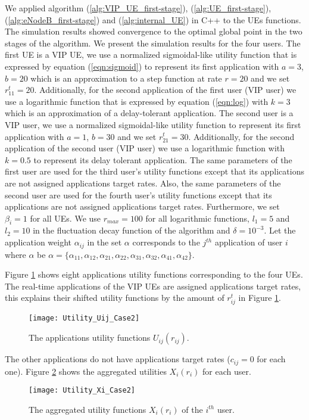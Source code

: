 \documentclass[journal]{IEEEtran} 				\IEEEoverridecommandlockouts 						\usepackage{amsmath,amssymb}
\begin{document}
We applied algorithm (\ref{alg:VIP_UE_first-stage}), (\ref{alg:UE_first-stage}), (\ref{alg:eNodeB_first-stage}) and (\ref{alg:internal_UE}) in C++ to the UEs functions. The simulation results showed convergence to the optimal global point in the two stages of the algorithm. We present the simulation results for the four users. The first UE is a VIP UE, we use a normalized sigmoidal-like utility function that is expressed by equation (\ref{eqn:sigmoid}) to represent its first application with $a = 3$, $b=20$ which is an approximation to a step function at rate $r =20$ and we set $r_{11}^{t}=20$. Additionally, for the second application of the first user (VIP user) we use a logarithmic function that is expressed by equation (\ref{eqn:log}) with $k = 3$ which is an approximation of a delay-tolerant application. The second user is a VIP user, we use a normalized sigmoidal-like utility function to represent its first application with $a = 1$, $b=30$ and we set $r_{21}^{t}=30$. Additionally, for the second application of the second user (VIP user) we use a logarithmic function with $k = 0.5$ to represent its delay tolerant application. The same parameters of the first user are used for the third user's utility functions except that its applications are not assigned applications target rates. Also, the same parameters of the second user are used for the fourth user's utility functions except that its applications are not assigned applications target rates. Furthermore, we set $\beta_i=1$ for all UEs. We use $r_{max}=100$ for all logarithmic functions, $l_1=5$ and $l_2=10$ in the fluctuation decay function of the algorithm and $\delta=10^{-3}$. Let the application weight $\alpha_{ij}$ in the set $\alpha$ corresponds to the $j^{th}$ application of user $i$ where $\alpha$ be  $\alpha = \{\alpha_{11}, \alpha_{12}, \alpha_{21}, \alpha_{22}, \alpha_{31}, \alpha_{32}, \alpha_{41}, \alpha_{42}\}$.

Figure \ref{fig:Utility_Uij_Case2} shows eight applications utility functions corresponding to the four UEs. The real-time applications of the VIP UEs are assigned applications target rates, this explains their shifted utility functions by the amount of $r_{ij}^{t}$ in Figure \ref{fig:Utility_Uij_Case2}.
\begin{figure}
\centering
\texttt{[image: Utility\_Uij\_Case2]}
\caption{The applications utility functions $U_{ij}(r_{ij})$.}
\label{fig:Utility_Uij_Case2}
\end{figure}
The other applications do not have applications target rates ($c_{ij}=0$ for each one). Figure \ref{fig:Utility_Xi_Case2} shows the aggregated utilities $X_i(r_i)$ for each user.
\begin{figure}
\centering
\texttt{[image: Utility\_Xi\_Case2]}
\caption{The aggregated utility functions $X_i(r_i)$ of the $i^{th}$ user.}
\label{fig:Utility_Xi_Case2}
\end{figure}
\end{document}
